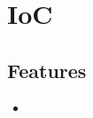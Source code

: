 \section{IoC}
\label{module:IoC}

\subsection{Features}
\begin{itemize}
	\item {}
\end{itemize}
\TODO
